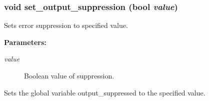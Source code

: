 \subsubsection{\setlength{\rightskip}{0pt plus 5cm}void set\_\-output\_\-suppression ({\bf bool} {\em value})}\label{util_8h_a0}


Sets error suppression to specified value.

\begin{Desc}
\item[{\bf Parameters: }]\par
\begin{description}
\item[
{\em value}]Boolean value of suppression.

\end{description}
\end{Desc}
Sets the global variable output\_\-suppressed to the specified value. 